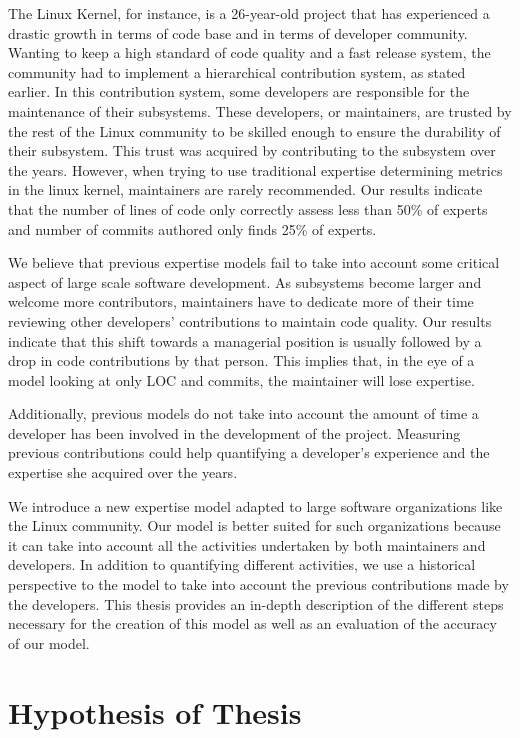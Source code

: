 The Linux Kernel, for instance, is a 26-year-old project that has experienced a drastic growth in terms of code base and in terms of developer community. Wanting to keep a high standard of code quality and a fast release system, the community had to implement a hierarchical contribution system, as stated earlier. In this contribution system, some developers are responsible for the maintenance of their subsystems. These developers, or maintainers, are trusted by the rest of the Linux community to be skilled enough to ensure the durability of their subsystem. This trust was acquired by contributing to the subsystem over the years. However, when trying to use traditional expertise determining metrics in the linux kernel, maintainers are rarely recommended. Our results indicate that the number of lines of code only correctly assess less than 50\% of experts and number of commits authored only finds 25\% of experts. 


We believe that previous expertise models fail to take into account some critical aspect of large scale software development. As subsystems become larger and welcome more contributors, maintainers have to dedicate more of their time reviewing other developers' contributions to maintain code quality. Our results indicate that this shift towards a managerial position is usually followed by a drop in code contributions by that person. This implies that, in the eye of a model looking at only \ac{LOC} and commits, the maintainer will lose expertise. 

Additionally, previous models do not take into account the amount of time a developer has been involved in the development of the project. Measuring previous contributions could help quantifying a developer's experience and the expertise she acquired over the years. 

We introduce a new expertise model adapted to large software organizations like the Linux community. Our model is better suited for such organizations because it can take into account all the activities undertaken by both maintainers and developers. In addition to quantifying different activities, we use a historical perspective to the model to take into account the previous contributions made by the developers. This thesis provides an in-depth description of the different steps necessary for the creation of this model as well as an evaluation of the accuracy of our model. 



\section{Hypothesis of Thesis}

